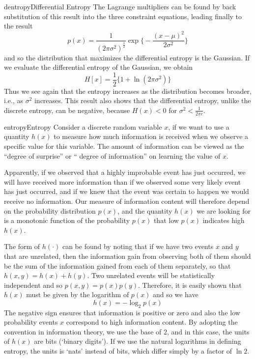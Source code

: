 \documentclass[9pt]{article}
\begin{document}
\begin{topic}{dentropy}{Differential Entropy}
The Lagrange multipliers can be found by back substitution of this result into the three constraint equations, leading finally to the result
\[
p(x) = \frac{1}{(2\pi \sigma^2)^{\frac{1}{2}}}\exp\bigg\{-\frac{(x-\mu)^2}{2\sigma^2}\bigg\}
\]
and so the distribution that maximizes the differential entropy is the Gaussian.
If we evaluate the differential entropy of the Gaussian, we obtain
\[
H[x] = \frac{1}{2}\{1+\ln(2\pi\sigma^2)\}
\]
Thus we see again that the entropy increases as the distribution becomes broader, i.e., as $\sigma^2$ increases. This result also shows that the differential entropy, unlike the discrete entropy, can be negative, because $H(x) < 0$ for $\sigma^2 < \frac{1}{2\pi e}$.
\end{topic}

\begin{topic}{entropy}{Entropy}
Consider a discrete random variable $x$, if we want to use a quantity $h(x)$ to measure how much information is received when we observe a specific value for this variable. The amount of information can be viewed as the ``degree of surprise'' or `` degree of information'' on learning the value of $x$. 

Apparently, if we observed that a highly improbable event has just occurred, we will have received more information than if we observed some very likely event has just occurred, and if we knew that the event was certain to happen we would receive no information. Our measure of information content will therefore depend on the probability distribution $p(x)$, and the quantity $h(x)$ we are looking for is a monotonic function of the probability $p(x)$ that low $p(x)$ indicates high $h(x)$.
 
The form of $h(\cdot)$ can be found by noting that if we have two events $x$ and $y$ that are unrelated, then the information gain from observing both of them should be the sum of the information gained from each of them separately, so that $h(x, y) = h(x) + h(y)$. Two unrelated events will be statistically independent and so $p(x, y) = p(x)p(y)$. Therefore, it is easily shown that $h(x)$ must be given by the logarithm of $p(x)$ and so we have
\[
h(x) = -\log_2 p(x)
\]
The negative sign ensures that information is positive or zero and also the low probability events $x$ correspond to high information content. By adopting the convention in information theory, we use the base of $2$, and in this case, the units of $h(x)$ are bits (`binary digits'). If we use the natural logarithms in defining entropy, the units is `nats' instead of bits, which differ simply by a factor of $\ln 2$.


\end{topic}
\end{document}
